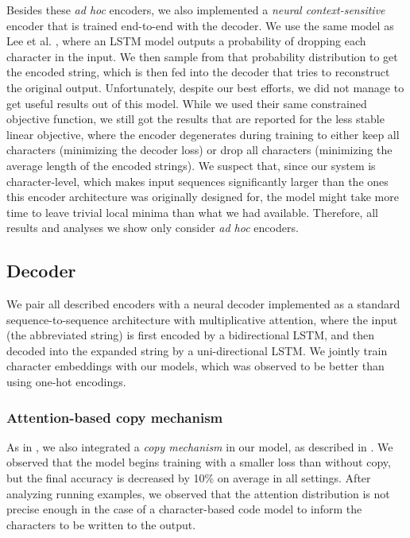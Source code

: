 \documentclass{article}
\begin{document}
Besides these \emph{ad hoc} encoders, we also
implemented a \emph{neural context-sensitive}
encoder that is trained end-to-end with the decoder.
We use the same model as Lee et al. \cite{lee2019learning}, where an LSTM model
outputs a probability of dropping each character
in the input. We then sample from that probability
distribution to get the encoded string, which is
then fed into the decoder that tries to reconstruct
the original output. Unfortunately, despite our
best efforts, we did not manage to get useful results
out of this model. While we used their same
constrained objective function, we still got the results that are reported for the less stable linear objective, where the encoder degenerates during
training to either
keep all characters (minimizing the decoder loss) or drop all characters (minimizing
the average length of the encoded strings).
We suspect that, since our system is character-level,
which makes input sequences significantly larger than the ones this encoder architecture was originally
designed for, the model might take more time to
leave trivial local minima than what we had available. Therefore, all results and analyses we show only
consider \emph{ad hoc} encoders.

\subsection{Decoder}

We pair all described encoders with
a neural decoder implemented as a standard
sequence-to-sequence architecture with
multiplicative attention, where
the input (the abbreviated string)
is first encoded by a bidirectional LSTM,
and then decoded into the expanded string
by a uni-directional LSTM. We jointly train character embeddings with our models, which
was observed to be better than using one-hot
encodings.

\subsubsection{Attention-based copy mechanism}

As in \cite{lee2019learning}, we also integrated a \emph{copy mechanism} in our
model, as described in \cite{copy_mech}.
We observed that the model begins training
with a smaller loss than without copy,
but the final accuracy is decreased
by 10\% on average in all settings.
After analyzing
running examples, we observed that the
attention distribution is not precise
enough in the case of a character-based
code model to inform the characters to be
written to the output.
\end{document}

